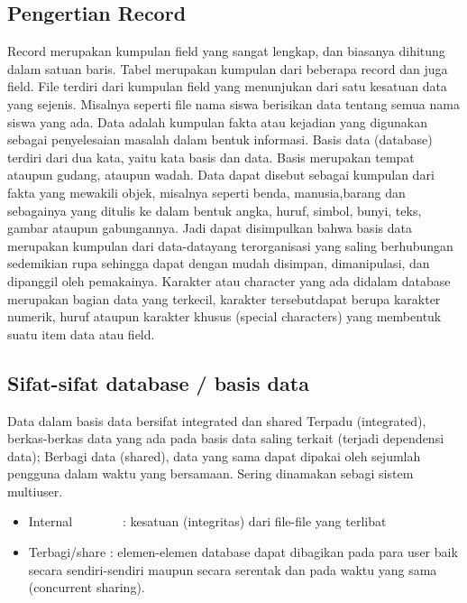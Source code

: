 \subsection{Pengertian Record}
Record merupakan kumpulan field yang sangat lengkap, dan biasanya dihitung dalam satuan baris. Tabel merupakan kumpulan dari beberapa record dan juga field. File terdiri dari kumpulan field yang menunjukan dari satu kesatuan data yang sejenis. Misalnya seperti file nama siswa berisikan data tentang semua nama siswa yang ada. Data adalah kumpulan fakta atau kejadian yang digunakan sebagai penyelesaian masalah dalam bentuk informasi. Basis data (database) terdiri dari dua kata, yaitu kata basis dan data. Basis merupakan tempat ataupun gudang, ataupun wadah.
Data dapat disebut sebagai kumpulan dari fakta yang mewakili objek, misalnya seperti benda, manusia,barang dan sebagainya yang ditulis ke dalam bentuk angka, huruf, simbol, bunyi, teks, gambar ataupun gabungannya. Jadi dapat disimpulkan bahwa basis data merupakan kumpulan dari data-datayang terorganisasi yang saling berhubungan sedemikian rupa sehingga dapat dengan mudah disimpan, dimanipulasi, dan dipanggil oleh pemakainya. Karakter atau character yang ada didalam database merupakan bagian data yang terkecil, karakter tersebutdapat berupa karakter numerik, huruf ataupun karakter khusus (special characters) yang membentuk suatu item data atau field.

\subsection{Sifat-sifat database / basis data}
Data dalam basis data bersifat integrated dan shared
Terpadu (integrated), berkas-berkas data yang ada pada basis data saling terkait (terjadi dependensi data);
Berbagi data (shared), data yang sama dapat dipakai oleh sejumlah pengguna dalam waktu yang bersamaan. Sering dinamakan sebagi sistem multiuser.


\begin{itemize}
\item Internal~~~~~~~~:  kesatuan (integritas) dari file-file yang terlibat

\item Terbagi/share : elemen-elemen database dapat dibagikan pada para user baik secara sendiri-sendiri maupun secara serentak dan pada waktu yang sama (concurrent sharing).\end{itemize}
\vspace{12pt}
 
